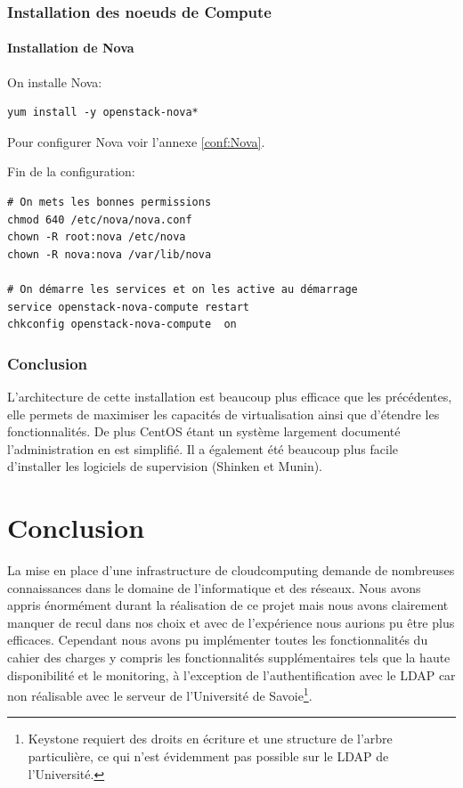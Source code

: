 \documentclass[a4paper,oneside]{report}
\begin{document}
\subsection{Installation des noeuds de Compute}
\subsubsection{Installation de Nova}
\noindent On installe Nova:
\begin{verbatim}
yum install -y openstack-nova*
\end{verbatim}

\noindent Pour configurer Nova voir l'annexe \ref{conf:Nova}.

\noindent Fin de la configuration:
\begin{verbatim}
# On mets les bonnes permissions
chmod 640 /etc/nova/nova.conf
chown -R root:nova /etc/nova
chown -R nova:nova /var/lib/nova

# On démarre les services et on les active au démarrage
service openstack-nova-compute restart
chkconfig openstack-nova-compute  on
\end{verbatim}

\subsection{Conclusion}
L'architecture de cette installation est beaucoup plus efficace que les précédentes, elle permets de maximiser les capacités de virtualisation ainsi que d'étendre les fonctionnalités. De plus CentOS étant un système largement documenté l'administration en est simplifié. Il a également été beaucoup plus facile d'installer les logiciels de supervision (Shinken et Munin).


\chapter{Conclusion}
La mise en place d'une infrastructure de \gls{cloudcomputing} demande de nombreuses connaissances dans le domaine de l'informatique et des réseaux.
Nous avons appris énormément durant la réalisation de ce projet mais nous avons clairement manquer de recul dans nos choix et avec de l'expérience nous aurions pu être plus efficaces.\newline
Cependant nous avons pu implémenter toutes les fonctionnalités du cahier des charges y compris les fonctionnalités supplémentaires tels que la haute disponibilité et le monitoring, à l'exception de l'authentification avec le LDAP car non réalisable avec le serveur de l'Université de Savoie\footnote{Keystone requiert des droits en écriture et une structure de l'arbre particulière, ce qui n'est évidemment pas possible sur le LDAP de l'Université.}.
\end{document}
